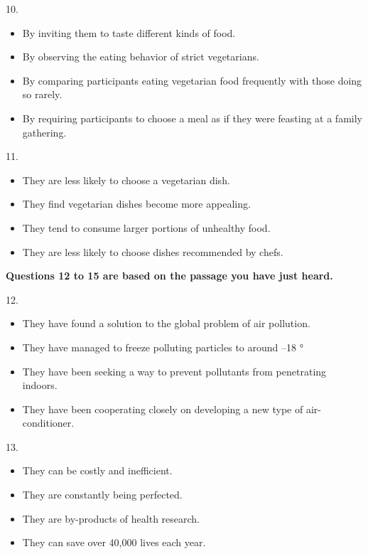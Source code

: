 \documentclass[UTF8,11pt]{ctexart}
\begin{document}
10.


\begin{itemize}[leftmargin=2em,itemsep=.2em,topsep=.4em]\item[A.] By inviting them to taste different kinds of food.
\item[B.] By observing the eating behavior of strict vegetarians.
\item[C.] By comparing participants eating vegetarian food frequently with those doing so rarely.
\item[D.] By requiring participants to choose a meal as if they were feasting at a family gathering.
\end{itemize}

11.


\begin{itemize}[leftmargin=2em,itemsep=.2em,topsep=.4em]\item[A.] They are less likely to choose a vegetarian dish.
\item[B.] They find vegetarian dishes become more appealing.
\item[C.] They tend to consume larger portions of unhealthy food.
\item[D.] They are less likely to choose dishes recommended by chefs.
\end{itemize}

\textbf{Questions 12 to 15 are based on the passage you have just heard.}


12.


\begin{itemize}[leftmargin=2em,itemsep=.2em,topsep=.4em]\item[A.] They have found a solution to the global problem of air pollution.
\item[B.] They have managed to freeze polluting particles to around –18 °
\end{itemize}

\begin{itemize}[leftmargin=2em,itemsep=.2em,topsep=.4em]\item[C.] They have been seeking a way to prevent pollutants from penetrating indoors.
\item[D.] They have been cooperating closely on developing a new type of air-conditioner.
\end{itemize}

13.


\begin{itemize}[leftmargin=2em,itemsep=.2em,topsep=.4em]\item[A.] They can be costly and inefficient.
\item[B.] They are constantly being perfected.
\item[C.] They are by-products of health research.
\item[D.] They can save over 40,000 lives each year.
\end{itemize}
\end{document}
